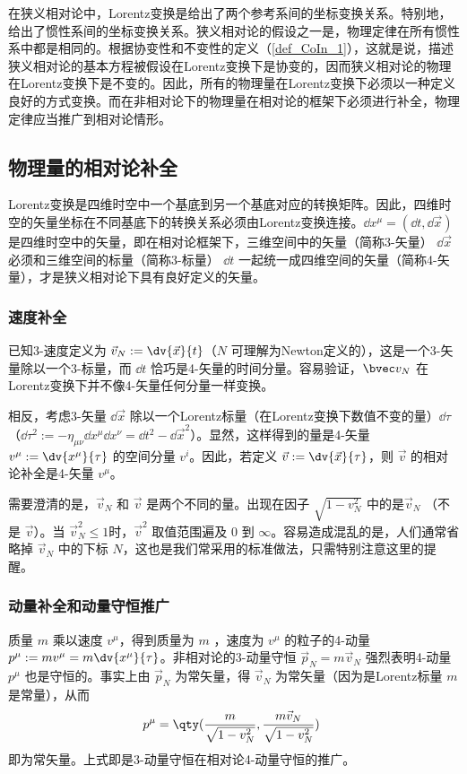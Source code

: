 
在狭义相对论中，Lorentz变换是给出了两个参考系间的坐标变换关系。特别地，给出了惯性系间的坐标变换关系。狭义相对论的假设之一是，物理定律在所有惯性系中都是相同的。根据协变性和不变性的定义（\autoref{def_CoIn_1}），这就是说，描述狭义相对论的基本方程被假设在Lorentz变换下是协变的，因而狭义相对论的物理在Lorentz变换下是不变的。因此，所有的物理量在Lorentz变换下必须以一种定义良好的方式变换。而在非相对论下的物理量在相对论的框架下必须进行补全，物理定律应当推广到相对论情形。
\subsection{物理量的相对论补全}
Lorentz变换是四维时空中一个基底到另一个基底对应的转换矩阵。因此，四维时空的矢量坐标在不同基底下的转换关系必须由Lorentz变换连接。$\dd x^\mu=(\dd t,\dd{\vec x})$ 是四维时空中的矢量，即在相对论框架下，三维空间中的矢量（简称3-矢量） $\dd{\vec x}$ 必须和三维空间的标量（简称3-标量） $\dd t$ 一起统一成四维空间的矢量（简称4-矢量），才是狭义相对论下具有良好定义的矢量。

\subsubsection{速度补全}
已知3-速度定义为 $\vec v_N:=\dv{\vec x}{t}$（$N$ 可理解为Newton定义的），这是一个3-矢量除以一个3-标量，而 $\dd t$ 恰巧是4-矢量的时间分量。容易验证，$\bvec v_N$ 在Lorentz变换下并不像4-矢量任何分量一样变换。

相反，考虑3-矢量 $\dd{\vec x}$ 除以一个Lorentz标量（在Lorentz变换下数值不变的量）$\dd\tau$ （$\dd \tau^2:=-\eta_{\mu\nu}\dd x^{\mu}\dd x^\nu=\dd t^2-\dd {\vec x^2}$）。显然，这样得到的量是4-矢量 $v^\mu:=\dv{x^\mu}{\tau}$ 的空间分量 $v^i$。因此，若定义 $\vec v:=\dv{\vec x}{\tau}$，则 $\vec v$ 的相对论补全是4-矢量 $v^\mu$。

需要澄清的是，$\vec v_N$ 和 $\vec v$ 是两个不同的量。出现在因子 $\sqrt{1-v_N^2}$ 中的是$\vec v_N$ （不是 $\vec v$）。当 $\vec v_N^2\leq1$时，$\vec v^2$ 取值范围遍及 $0$ 到 $\infty$。容易造成混乱的是，人们通常省略掉 $\vec v_N$ 中的下标 $N$，这也是我们常采用的标准做法，只需特别注意这里的提醒。

\subsubsection{动量补全和动量守恒推广}
质量 $m$ 乘以速度 $v^\mu$，得到质量为 $m$ ，速度为 $v^\mu$ 的粒子的4-动量 $p^\mu:=mv^\mu=m\dv{x^\mu}{\tau}$。非相对论的3-动量守恒 $\vec p_N=m\vec v_N$ 强烈表明4-动量 $p^\mu$ 也是守恒的。事实上由 $\vec p_N$ 为常矢量，得 $\vec v_N$ 为常矢量（因为是Lorentz标量 $m$ 是常量），从而 
\begin{equation}
p^\mu=\qty(\frac{m}{\sqrt{1-v_N^2}},\frac{m\vec v_N}{\sqrt{1-v_N^2}})~
\end{equation}
即为常矢量。上式即是3-动量守恒在相对论4-动量守恒的推广。

